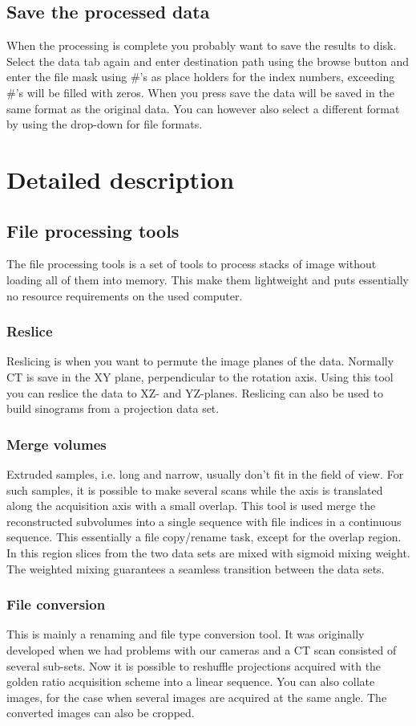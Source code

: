 \documentclass[a4paper]{scrreprt}
\begin{document}
\section{Save the processed data}
When the processing is complete you probably want to save the results to disk. Select the data tab again and enter destination path using the browse button and enter the file mask using \#'s as place holders for the index numbers, exceeding \#'s will be filled with zeros. When you press save the data will be saved in the same format as the original data. You can however also select a different format by using the drop-down for file formats. 

\chapter{Detailed description}
\section{File processing tools}
The file processing tools is a set of tools to process stacks of image without loading all of them into memory. This make them lightweight and puts essentially no resource requirements on the used computer.
\subsection{Reslice}
Reslicing is when you want to permute the image planes of the data. Normally CT is save in the XY plane, perpendicular to the rotation axis. Using this tool you can reslice the data to XZ- and YZ-planes. Reslicing can also be used to build sinograms from a projection data set.

\subsection{Merge volumes}
Extruded samples, i.e. long and narrow, usually don't fit in the field of view. For such samples, it is possible to make several scans while the axis is translated along the acquisition axis with a small overlap. This tool is used merge the reconstructed subvolumes into a single sequence with file indices in a continuous sequence. This essentially a file copy/rename task, except for the overlap region. In this region slices from the two data sets are mixed with sigmoid mixing weight. The weighted mixing guarantees a seamless transition between the data sets.

\subsection{File conversion}
This is mainly a renaming and file type conversion tool. It was originally developed when we had problems with our cameras and a CT scan consisted of several sub-sets. Now it is possible to reshuffle projections acquired with the golden ratio acquisition scheme into a linear sequence. You can also collate images, for the case when several images are acquired at the same angle. The converted images can also be cropped.
\end{document}
